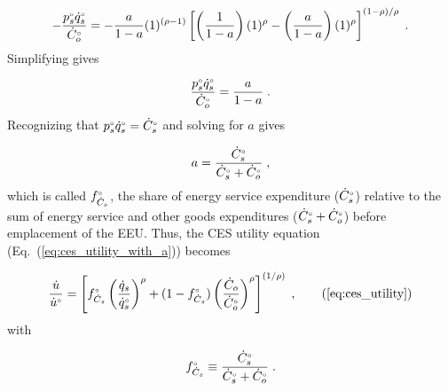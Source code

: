 \documentclass[12pt]{article}\usepackage[]{graphicx}\usepackage[]{xcolor}
\begin{document}
\begin{equation}
  - \frac{{}{p}^{\scriptscriptstyle \circ}_s {}{\dot{q}}^{\scriptscriptstyle \circ}_s}{{}{\dot{C}}^{\scriptscriptstyle \circ}_o} =
        -\frac{a}{1 - a} (1)^{(\rho -1)}
        \left[ \left( \frac{1}{1 - a} \right) (1)^\rho
                - \left( \frac{a}{1 - a} \right) 
                          (1)^\rho \right]^{(1 - \rho)/\rho} \; .
\end{equation}
%
Simplifying gives

\begin{equation}
  \frac{{}{p}^{\scriptscriptstyle \circ}_s {}{\dot{q}}^{\scriptscriptstyle \circ}_s}{{}{\dot{C}}^{\scriptscriptstyle \circ}_o} = \frac{a}{1 - a} \; .
\end{equation}
%
Recognizing that ${}{p}^{\scriptscriptstyle \circ}_s {}{\dot{q}}^{\scriptscriptstyle \circ}_s = {}{\dot{C}}^{\scriptscriptstyle \circ}_s$ and solving for
$a$ gives

\begin{equation}
  a = \frac{{}{\dot{C}}^{\scriptscriptstyle \circ}_s}{{}{\dot{C}}^{\scriptscriptstyle \circ}_s + {}{\dot{C}}^{\scriptscriptstyle \circ}_o} \; ,
\end{equation}
%
which is called ${}{f}^{\scriptscriptstyle \circ}_{\dot{C}_s}$, 
the share of energy service expenditure (${}{\dot{C}}^{\scriptscriptstyle \circ}_s$) 
relative to the sum of energy service and other goods expenditures 
(${}{\dot{C}}^{\scriptscriptstyle \circ}_s + {}{\dot{C}}^{\scriptscriptstyle \circ}_o$) 
before emplacement of the EEU.
Thus, the CES utility equation (Eq.~(\ref{eq:ces_utility_with_a})) becomes

\begin{equation} 
    \frac{\rate{u}}{\rbempl{u}} = \cesutility{} \; , \tag{\ref{eq:ces_utility}}
\end{equation}
%
with 

\begin{equation} \label{eq:fCs}
  {}{f}^{\scriptscriptstyle \circ}_{\dot{C}_s} \equiv \frac{{}{\dot{C}}^{\scriptscriptstyle \circ}_s}{{}{\dot{C}}^{\scriptscriptstyle \circ}_s + {}{\dot{C}}^{\scriptscriptstyle \circ}_o} \; .
\end{equation}
\end{document}
